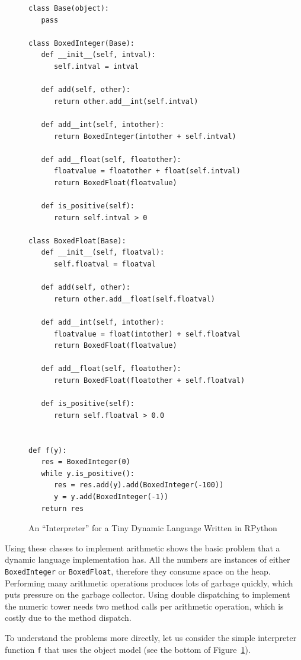 \documentclass[preprint]{sigplanconf}
\begin{document}
\begin{figure}
\begin{lstlisting}[mathescape]
class Base(object):
   pass

class BoxedInteger(Base):
   def __init__(self, intval):
      self.intval = intval

   def add(self, other):
      return other.add__int(self.intval)

   def add__int(self, intother):
      return BoxedInteger(intother + self.intval)

   def add__float(self, floatother):
      floatvalue = floatother + float(self.intval)
      return BoxedFloat(floatvalue)

   def is_positive(self):
      return self.intval > 0

class BoxedFloat(Base):
   def __init__(self, floatval):
      self.floatval = floatval

   def add(self, other):
      return other.add__float(self.floatval)

   def add__int(self, intother):
      floatvalue = float(intother) + self.floatval
      return BoxedFloat(floatvalue)

   def add__float(self, floatother):
      return BoxedFloat(floatother + self.floatval)

   def is_positive(self):
      return self.floatval > 0.0


def f(y):
   res = BoxedInteger(0)
   while y.is_positive():
      res = res.add(y).add(BoxedInteger(-100))
      y = y.add(BoxedInteger(-1))
   return res
\end{lstlisting}
\caption{An ``Interpreter'' for a Tiny Dynamic Language Written in RPython}
\label{fig:objmodel}
\end{figure}

Using these classes to implement arithmetic shows the basic problem that a
dynamic language implementation has. All the numbers are instances of either
\lstinline{BoxedInteger} or \lstinline{BoxedFloat}, therefore they consume space on the
heap. Performing many arithmetic operations produces lots of garbage quickly,
which puts pressure on the garbage collector. Using double dispatching to
implement the numeric tower needs two method calls per arithmetic operation,
which is costly due to the method dispatch.

To understand the problems more directly, let us consider the simple
interpreter function \lstinline{f} that uses the object model (see the bottom of
Figure~\ref{fig:objmodel}).
\end{document}
